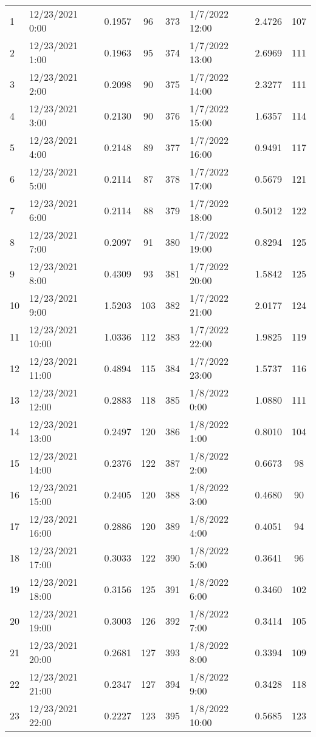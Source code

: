 \begin{center}
\begin{longtable}{llccllcc}
    1&12/23/2021   0:00	   &0.1957&96 &373&1/7/2022 12:00	    &2.4726&107 \\
    2&12/23/2021   1:00	   &0.1963&95 &374&1/7/2022 13:00	    &2.6969&111 \\
    3&12/23/2021   2:00	   &0.2098&90 &375&1/7/2022 14:00	    &2.3277&111 \\
    4&12/23/2021   3:00	   &0.2130&90 &376&1/7/2022 15:00	    &1.6357&114 \\
    5&12/23/2021   4:00	   &0.2148&89 &377&1/7/2022 16:00	    &0.9491&117 \\
    6&12/23/2021   5:00	   &0.2114&87 &378&1/7/2022 17:00	    &0.5679&121 \\
    7&12/23/2021   6:00	   &0.2114&88 &379&1/7/2022 18:00	    &0.5012&122 \\
    8&12/23/2021   7:00	   &0.2097&91 &380&1/7/2022 19:00	    &0.8294&125 \\
    9&12/23/2021   8:00	   &0.4309&93 &381&1/7/2022 20:00	    &1.5842&125 \\
    10&12/23/2021  9:00	   &1.5203&103&382&1/7/2022 21:00	    &2.0177&124 \\
    11&12/23/2021  10:00&1.0336&112&383&1/7/2022 22:00	    &1.9825&119 \\
    12&12/23/2021  11:00&0.4894&115&384&1/7/2022 23:00	    &1.5737&116 \\
    13&12/23/2021  12:00&0.2883&118&385&1/8/2022 0:00	    &1.0880&111 \\
    14&12/23/2021  13:00&0.2497&120&386&1/8/2022 1:00	    &0.8010&104 \\
    15&12/23/2021  14:00&0.2376&122&387&1/8/2022 2:00	    &0.6673&98  \\
    16&12/23/2021  15:00&0.2405&120&388&1/8/2022 3:00	    &0.4680&90  \\
    17&12/23/2021  16:00&0.2886&120&389&1/8/2022 4:00	    &0.4051&94  \\
    18&12/23/2021  17:00&0.3033&122&390&1/8/2022 5:00	    &0.3641&96  \\
    19&12/23/2021  18:00&0.3156&125&391&1/8/2022 6:00	    &0.3460&102 \\
    20&12/23/2021  19:00&0.3003&126&392&1/8/2022 7:00	    &0.3414&105 \\
    21&12/23/2021  20:00&0.2681&127&393&1/8/2022 8:00	    &0.3394&109 \\
    22&12/23/2021  21:00&0.2347&127&394&1/8/2022 9:00	    &0.3428&118 \\
    23&12/23/2021  22:00&0.2227&123&395&1/8/2022 10:00	    &0.5685&123 \\

\end{longtable}
\end{center}
